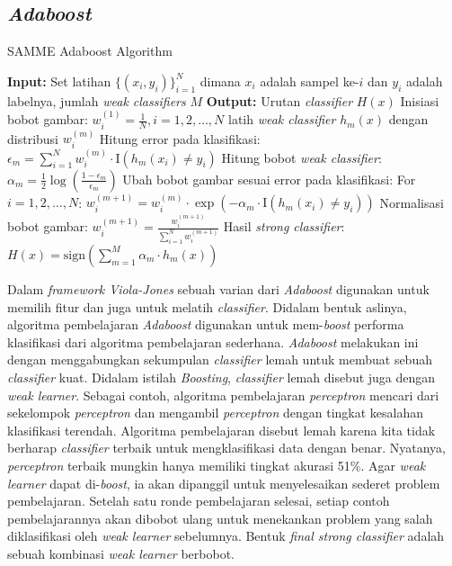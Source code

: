 \subsection{\emph{Adaboost}}

\begin{algorithm}
\caption{SAMME Adaboost Algorithm}
\begin{algorithmic}[1]
\State \textbf{Input:} Set latihan $\{(x_i, y_i)\}_{i=1}^N$ dimana $x_i$ adalah sampel ke-$i$ dan $y_i$ adalah labelnya, jumlah \textit{weak classifiers} $M$
\State \textbf{Output:} Urutan \textit{classifier} $H(x)$
\State Inisiasi bobot gambar: $w_i^{(1)} = \frac{1}{N}, i=1,2,\ldots,N$
    \State latih \textit{weak classifier} $h_m(x)$ dengan distribusi $w_i^{(m)}$
    \State Hitung error pada klasifikasi: $\epsilon_m = \sum_{i=1}^N w_i^{(m)} \cdot \text{I}(h_m(x_i) \neq y_i)$
    \State Hitung bobot \textit{weak classifier}: $\alpha_m = \frac{1}{2} \log\left(\frac{1 - \epsilon_m}{\epsilon_m}\right)$
    \State Ubah bobot gambar sesuai error pada klasifikasi:
    \State \hspace{\algorithmicindent} For $i=1,2,\ldots,N$: $w_i^{(m+1)} = w_i^{(m)} \cdot \exp(-\alpha_m \cdot \text{I}(h_m(x_i) \neq y_i))$
    \State Normalisasi bobot gambar: $w_i^{(m+1)} = \frac{w_i^{(m+1)}}{\sum_{i=1}^N w_i^{(m+1)}}$
\EndFor
\State Hasil \textit{strong classifier}: $H(x) = \text{sign}\left(\sum_{m=1}^M \alpha_m \cdot h_m(x)\right)$
\end{algorithmic}
\end{algorithm}

Dalam \emph{framework Viola-Jones} sebuah varian dari \emph{Adaboost} 
digunakan untuk memilih fitur dan juga untuk melatih \textit{classifier}. 
Didalam bentuk aslinya, algoritma pembelajaran \emph{Adaboost} digunakan 
untuk mem-\textit{boost} performa klasifikasi dari algoritma pembelajaran 
sederhana. \emph{Adaboost} melakukan ini dengan menggabungkan sekumpulan 
\emph{classifier} lemah untuk membuat sebuah \emph{classifier} kuat. 
Didalam istilah \emph{Boosting}, \emph{classifier} lemah disebut juga 
dengan \emph{weak learner}. Sebagai contoh, algoritma pembelajaran \emph{perceptron} 
mencari dari sekelompok \emph{perceptron} dan mengambil \emph{perceptron} 
dengan tingkat kesalahan klasifikasi terendah. Algoritma pembelajaran disebut 
lemah karena kita tidak berharap \emph{classifier} terbaik untuk mengklasifikasi 
data dengan benar. Nyatanya, \emph{perceptron} terbaik mungkin 
hanya memiliki tingkat akurasi 51\%. Agar \emph{weak learner} dapat di-\textit{boost}, 
ia akan dipanggil untuk menyelesaikan sederet problem pembelajaran. Setelah 
satu ronde pembelajaran selesai, setiap contoh pembelajarannya akan dibobot ulang 
untuk menekankan problem yang salah diklasifikasi oleh \emph{weak learner} 
sebelumnya. Bentuk \emph{final strong classifier} adalah 
sebuah kombinasi \emph{weak learner} berbobot. 

